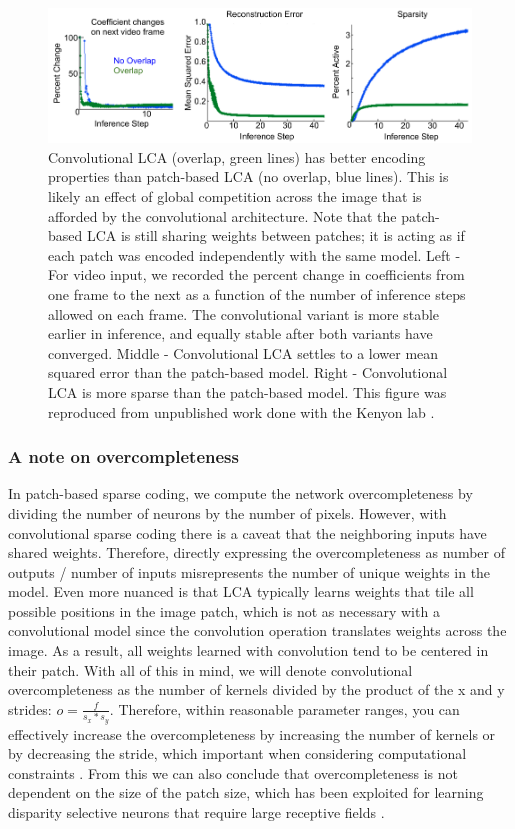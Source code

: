\begin{figure}\label{fig:ch2_lca_conv_benefit}
    \centering
    \includegraphics{figures/conv_lca_benefits.png}
    \caption{Convolutional LCA (overlap, green lines) has better encoding properties than patch-based LCA (no overlap, blue lines). This is likely an effect of global competition across the image that is afforded by the convolutional architecture. Note that the patch-based LCA is still sharing weights between patches; it is acting as if each patch was encoded independently with the same model. Left - For video input, we recorded the percent change in coefficients from one frame to the next as a function of the number of inference steps allowed on each frame. The convolutional variant is more stable earlier in inference, and equally stable after both variants have converged. Middle - Convolutional LCA settles to a lower mean squared error than the patch-based model. Right - Convolutional LCA is more sparse than the patch-based model. This figure was reproduced from unpublished work done with the Kenyon lab \citeyearpar{paiton2013deep}.}
\end{figure}

\subsubsection{A note on overcompleteness}
In patch-based sparse coding, we compute the network overcompleteness by dividing the number of neurons by the number of pixels. However, with convolutional sparse coding there is a caveat that the neighboring inputs have shared weights. Therefore, directly expressing the overcompleteness as number of outputs / number of inputs misrepresents the number of unique weights in the model. Even more nuanced is that LCA typically learns weights that tile all possible positions in the image patch, which is not as necessary with a convolutional model since the convolution operation translates weights across the image. As a result, all weights learned with convolution tend to be centered in their patch. With all of this in mind, we will denote convolutional overcompleteness as the number of kernels divided by the product of the x and y strides: $o = \tfrac{f}{s_{x}*s_{y}}$. Therefore, within reasonable parameter ranges, you can effectively increase the overcompleteness by increasing the number of kernels or by decreasing the stride, which important when considering computational constraints \parencite{schultz2014replicating}. From this we can also conclude that overcompleteness is not dependent on the size of the patch size, which has been exploited for learning disparity selective neurons that require large receptive fields \parencite{lundquist2016sparse}.

